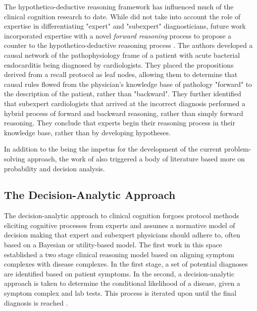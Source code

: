 The hypothetico-deductive reasoning framework has influenced much of the clinical cognition research to date. While \citet*{elstein1978medical} did not take into account the role of expertise in differentiating "expert" and "subexpert" diagnosticians, future work incorporated expertise with a novel \emph{forward reasoning} process to propose a counter to the hypothetico-deductive reasoning process \citep{patelKnowledgeBasedSolution1986}. The authors developed a causal network of the pathophysiology frame of a patient with acute bacterial endocarditis being diagnosed by cardiologists. They placed the propositions derived from a recall protocol as leaf nodes, allowing them to determine that causal rules flowed from the physician's knowledge base of pathology "forward" to the description of the patient, rather than "backward". They further identified that subexpert cardiologists that arrived at the incorrect diagnosis performed a hybrid process of forward and backward reasoning, rather than simply forward reasoning. They conclude that experts begin their reasoning process in their knowledge base, rather than by developing hypotheses. 

In addition to the being the impetus for the development of the current problem-solving approach, the work of \citet*{elstein1978medical} also triggered a body of literature based more on probability and decision analysis. 

\subsection{The Decision-Analytic Approach}
The decision-analytic approach to clinical cognition forgoes protocol methods eliciting cognitive processes from experts and assumes a normative model of decision making that expert and subexpert physicians should adhere to, often based on a Bayesian or utility-based model. The first work in this space established a two stage clinical reasoning model based on aligning symptom complexes with disease complexes. In the first stage, a set of potential diagnoses are identified based on patient symptoms. In the second, a decision-analytic approach is taken to determine the conditional likelihood of a disease, given a symptom complex and lab tests. This process is iterated upon until the final diagnosis is reached \citep{ledley1959reasoning}. 

